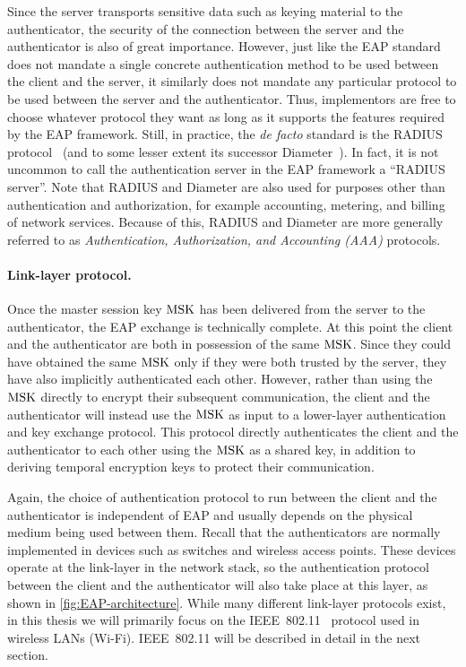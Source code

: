 Since the server transports sensitive data such as keying material to the authenticator,
the security of the connection between the server and the authenticator is also of great importance.
However,
just like the EAP standard does not mandate a single concrete authentication method to be used between the client and the server,
it similarly does not mandate any particular protocol to be used between the server and the authenticator.
Thus,
implementors are free to choose whatever protocol they want as long as it supports the features required by the EAP framework.
Still,
in practice, the \emph{de facto} standard is the RADIUS protocol~\cite{IETF:RFC2865:RADIUS}
(and to some lesser extent its successor Diameter~\cite{IETF:RFC6733:DIAMETER}).
In fact,
it is not uncommon to call the authentication server in the EAP framework a ``RADIUS server''.
Note that RADIUS and Diameter are also used for purposes other than authentication and authorization,
for example accounting, metering, and billing of network services.
Because of this,
RADIUS and Diameter are more generally referred to as \emph{Authentication, Authorization, and Accounting (AAA)} protocols.

\paragraph{Link-layer protocol.}
Once the master session key $\mathrm{MSK}$ has been delivered from the server to the authenticator,
the EAP exchange is technically complete.
At this point the client and the authenticator are both in possession of the same $\mathrm{MSK}$.
Since they could have obtained the same $\mathrm{MSK}$ only if they were both trusted by the server,
they have also implicitly authenticated each other.
However,
rather than using the $\mathrm{MSK}$ directly to encrypt their subsequent communication,
the client and the authenticator will instead use the $\mathrm{MSK}$ as input to a lower-layer authentication and key exchange protocol.
This protocol directly authenticates the client and the authenticator to each other using the $\mathrm{MSK}$ as a shared key,
in addition to deriving temporal encryption keys to protect their communication.  

Again,
the choice of authentication protocol to run between the client and the authenticator is independent of EAP and usually depends on the physical medium being used between them. 
Recall that the authenticators are normally implemented in devices such as switches and wireless access points.
These devices operate at the link-layer in the network stack,
so the authentication protocol between the client and the authenticator will also take place at this layer,
as shown in \cref{fig:EAP-architecture}.
While many different link-layer protocols exist,
in this thesis we will primarily focus on the IEEE~802.11~\cite{IEEE:2012:802.11} protocol used in wireless LANs (Wi-Fi).
IEEE~802.11 will be described in detail in the next section.


